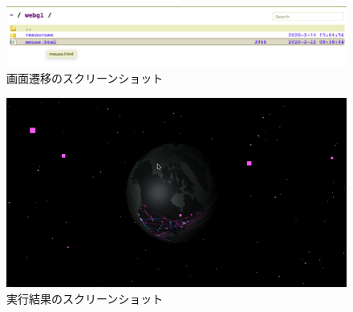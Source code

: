 \documentclass[a4paper,12pt]{jarticle}
\begin{document}
\begin{figure}[h]
\begin{center}
 \includegraphics[width=150mm]{procedure.png}
 \caption{画面遷移のスクリーンショット}
\end{center}
\end{figure}

\begin{figure}[h]
\begin{center}
 \includegraphics[width=150mm]{shot.png}
 \caption{実行結果のスクリーンショット}
\end{center}
\end{figure}
\end{document}
